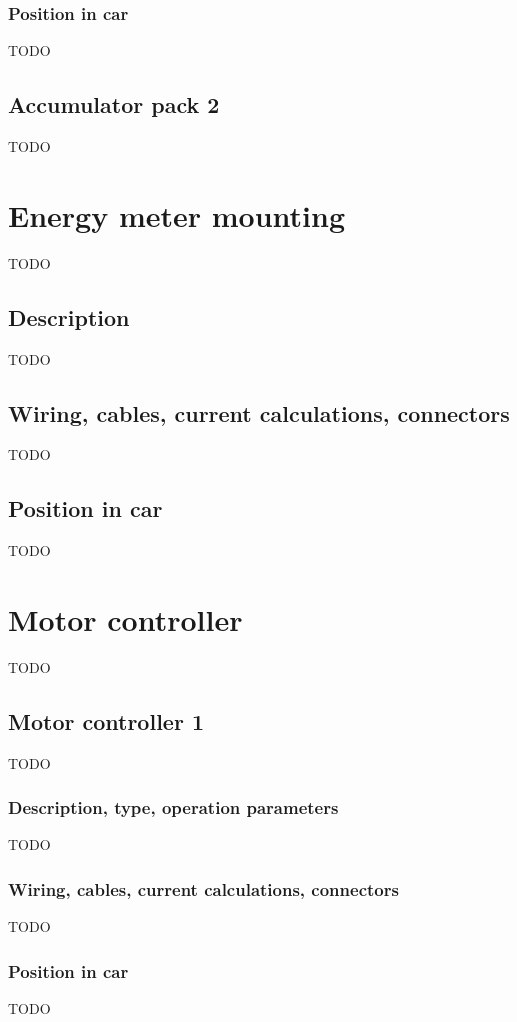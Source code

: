\documentclass{article}
\begin{document}
\subsubsection{Position in car}
TODO

\subsection{Accumulator pack 2}
TODO

\section{Energy meter mounting}
TODO

\subsection{Description}
TODO

\subsection{Wiring, cables, current calculations, connectors}
TODO

\subsection{Position in car}
TODO

\section{Motor controller}
TODO

\subsection{Motor controller 1}
TODO

\subsubsection{Description, type, operation parameters}
TODO

\subsubsection{Wiring, cables, current calculations, connectors}
TODO

\subsubsection{Position in car}
TODO
\end{document}
